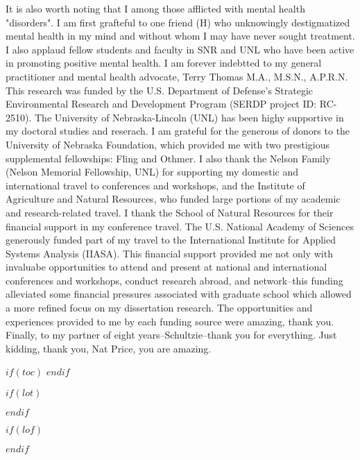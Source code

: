\documentclass[print]{nuthesis}
\begin{document}
\begin{acknowledgments}
It is also worth noting that I among those afflicted with mental health "disorders". I am first grafteful to one friend (H) who unknowingly destigmatized mental health in my mind and without whom I may have never sought treatment. I also applaud fellow students and faculty in SNR and UNL who have been active in promoting positive mental health. I am forever  indebtted to my general practitioner and mental health advocate, Terry Thomas M.A., M.S.N., A.P.R.N.
This research was funded by the U.S. Department of Defense’s Strategic Environmental Research and Development Program (SERDP project ID: RC-2510). The University of Nebraska-Lincoln (UNL) has been highy supportive in my doctoral studies and reserach. I am grateful for the generous of donors to the University of Nebraska Foundation, which provided me with two prestigious supplemental fellowships: Fling and Othmer. I also thank the Nelson Family (Nelson Memorial Fellowship, UNL) for supporting my domestic and international travel to conferences and workshops, and the Institute of Agriculture and Natural Resources, who funded large portions of my academic and research-related travel. I thank the School of Natural Resources for their financial support in my conference travel. The U.S. National Academy of Sciences generously funded part of my travel to the International Institute for Applied Systems Analysis (IIASA). This financial support provided me not only with invaluabe opportunities to attend and present at national and international conferences and workshops, conduct research abroad, and network--this funding alleviated some financial pressures associated with graduate school which allowed a more refined focus on my dissertation research. The opportunities and experiences provided to me by each funding source were amazing, thank you. 
Finally, to my partner of eight years--Schultzie--thank you for everything. Just kidding, thank you, Nat Price, you are amazing.
 \end{acknowledgments}



$if(toc)$
\tableofcontents
$endif$

$if(lot)$
  \listoftables
$endif$

$if(lof)$
  \listoffigures
$endif$

\mainmatter
\end{document}
